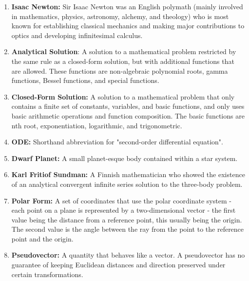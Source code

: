 \documentclass[12pt]{article}
\begin{document}
\begin{spacing}{1.25}
{\begin{enumerate}
        \item \label{app:newton} \textbf{Isaac Newton:} Sir Isaac Newton was an English polymath (mainly involved in mathematics, physics, astronomy, alchemy, and theology) who is most known for establishing classical mechanics and making major contributions to optics and developing infinitesimal calculus.

        \item \label{app:analytical_solution} \textbf{Analytical Solution}: A solution to a mathematical problem restricted by the same rule as a closed-form solution, but with additional functions that are allowed. These functions are non-algebraic polynomial roots, gamma functions, Bessel functions, and special functions.

        \item \label{app:closed_form} \textbf{Closed-Form Solution:} A solution to a mathematical problem that only contains a finite set of constants, variables, and basic functions, and only uses basic arithmetic operations and function composition. The basic functions are nth root, exponentiation, logarithmic, and trigonometric.
        
        \item \label{app:ode} \textbf{ODE:} Shorthand abbreviation for "second-order differential equation".

        \item \label{app:dwarf_planet} \textbf{Dwarf Planet:} A small planet-esque body contained within a star system.

        \item \label{app:sundman} \textbf{Karl Fritiof Sundman:} A Finnish mathematician who showed the existence of an analytical convergent infinite series solution to the three-body problem.

        \item \label{app:polar_form} \textbf{Polar Form:} A set of coordinates that use the polar coordinate system - each point on a plane is represented by a two-dimensional vector - the first value being the distance from a reference point, this usually being the origin. The second value is the angle between the ray from the point to the reference point and the origin.

        \item \label{app:pseudovector} \textbf{Pseudovector:} A quantity that behaves like a vector. A pseudovector has no guarantee of keeping Euclidean distances and direction preserved under certain transformations. 
        

\end{enumerate}}
\end{spacing}
\end{document}
